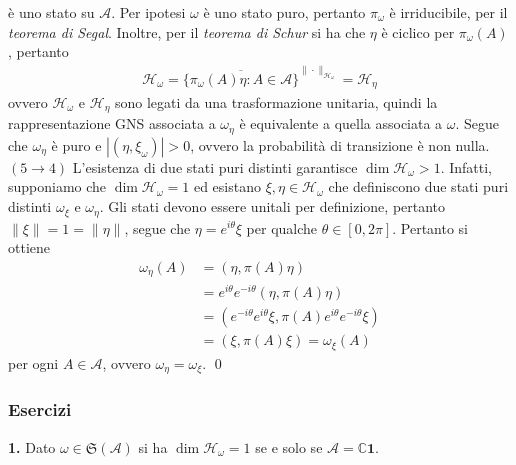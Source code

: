 \documentclass{article}
\numberwithin{equation}{subsection}
\begin{document}
è uno stato su $\mathscr{A}$. Per ipotesi $\omega$ è uno stato puro, pertanto $\pi_\omega$ è irriducibile, per il \textit{teorema di Segal}. Inoltre, per il \textit{teorema di Schur} si ha che $\eta$ è ciclico per $\pi_\omega(A)$, pertanto
\begin{align*}
    \mathcal{H}_\omega = \overline{\{\pi_\omega(A)\eta : A \in \mathscr{A}\}}^{\|\cdot\|_{\mathcal{H}_\omega}} = \mathcal{H}_\eta
\end{align*}
ovvero $\mathcal{H}_\omega$ e $\mathcal{H}_\eta$ sono legati da una trasformazione unitaria, quindi la rappresentazione GNS associata a $\omega_\eta$ è equivalente a quella associata a $\omega$. Segue che $\omega_\eta$ è puro e $|(\eta, \xi_\omega)| > 0$, ovvero la probabilità di transizione è non nulla. \\
$(5 \rightarrow 4)$ L'esistenza di due stati puri distinti garantisce $\dim \mathcal{H}_\omega > 1$. Infatti, supponiamo che $\dim \mathcal{H}_\omega = 1$ ed esistano $\xi, \eta \in \mathcal{H}_\omega$ che definiscono due stati puri distinti $\omega_\xi$ e $\omega_\eta$. Gli stati devono essere unitali per definizione, pertanto $\|\xi\| = 1 = \|\eta\|$, segue che $\eta = e^{i\theta}\xi$ per qualche $\theta \in [0, 2\pi]$. Pertanto si ottiene
\begin{align*}
    \omega_\eta(A) &= (\eta, \pi(A)\eta) \\
    &= e^{i\theta}e^{-i\theta}(\eta, \pi(A)\eta) \\
    &= (e^{-i\theta}e^{i\theta}\xi, \pi(A)e^{i\theta}e^{-i\theta}\xi) \\
    &= (\xi, \pi(A)\xi) = \omega_\xi(A)
\end{align*}
per ogni $A \in \mathscr{A}$, ovvero $\omega_\eta = \omega_\xi$. \qed


\subsubsection{Esercizi}
\textbf{1.} Dato $\omega \in \mathfrak{S}(\mathscr{A})$ si ha $\dim \mathcal{H}_\omega = 1$ se e solo se $\mathscr{A} = \mathbb{C}\mathbf{1}$. \\
\end{document}
